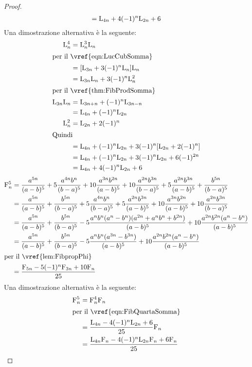 \begin{proof}
\begin{align*}
	={}&\mathrm{L}_{4n}+4(-1)^n\mathrm{L}_{2n}+6\\
\end{align*}
Una dimostrazione alternativa è la seguente:
\begin{align*}
\Luc{n}^4={}&\Luc{n}^3\Luc{n}\\
\intertext{per il~\vref{eqn:LucCubSomma}}
={}&[\Luc{3n}+3(-1)^n\Luc{n}]\Luc{n}\\
={}&\Luc{3n}\Luc{n}+3(-1)^n\Luc{n}^2\\
\intertext{per il~\vref{thm:FibProdSomma}}
\Luc{3n}\Luc{n}={}&\Luc{3n+n}+(-1)^n\Luc{3n-n}\\
={}&\Luc{4n}+(-1)^n\Luc{2n}\\
\Luc{n}^2={}&\Luc{2n}+2(-1)^n\\
\intertext{Quindi}
={}&\Luc{4n}+(-1)^n\Luc{2n}+3(-1)^n[\Luc{2n}+2(-1)^n]\\
={}&\Luc{4n}+(-1)^n\Luc{2n}+3(-1)^n\Luc{2n}+6(-1)^{2n}\\
={}&\Luc{4n}+4(-1)^n\Luc{2n}+6\\
\end{align*}
\begin{align*}
\Fib{n}^5={}&\dfrac{a^{5n}}{(a-b)^5}+5\dfrac{a^{4n}b^{n}}{(b-a)^5}+10\dfrac{a^{3n}b^{2n}}{(a-b)^5}+10\dfrac{a^{2n}b^{3n}}{(b-a)^5}+5\dfrac{a^{2n}b^{3n}}{(a-b)^5}+\dfrac{b^{5n}}{(b-a)^5}\\
={}&\dfrac{a^{5n}}{(a-b)^5}+\dfrac{b^{5n}}{(b-a)^5}+5\dfrac{a^{4n}b^{n}}{(b-a)^5}+5\dfrac{a^{2n}b^{3n}}{(a-b)^5}+10\dfrac{a^{3n}b^{2n}}{(a-b)^5}+10\dfrac{a^{2n}b^{3n}}{(b-a)^5}\\
={}&\dfrac{a^{5n}}{(a-b)^5}+\dfrac{b^{5n}}{(b-a)^5}-5\dfrac{a^nb^n(a^n-b^n)(a^{2n}+a^nb^n+b^{2n})}{(a-b)^5}+10\dfrac{a^{2n}b^{2n}(a^n-b^n)}{(a-b)^5}\\
={}&\dfrac{a^{5n}}{(a-b)^5}+\dfrac{b^{5n}}{(b-a)^5}-5\dfrac{a^nb^n(a^{3n}-b^{3n})}{(a-b)^5}+10\dfrac{a^{2n}b^{2n}(a^n-b^n)}{(a-b)^5}\\
	\intertext{per il~\vref{lem:FibpropPhi}} 
={}&\dfrac{\Fib{5n}-5(-1)^n\Fib{3n}+10\Fib{n}}{25}\\	
\end{align*}
Una dimostrazione alternativa è la seguente:
\begin{align*}
	\Fib{n}^5={}&\Fib{n}^4\Fib{n}\\
	\intertext{per il~\vref{eqn:FibQuartaSomma}}
	={}&\dfrac{\Luc{4n}-4(-1)^n\Luc{2n}+6}{25}\Fib{n}\\
	={}&\dfrac{\Luc{4n}\Fib{n}-4(-1)^n\Luc{2n}\Fib{n}+6\Fib{n}}{25}\\

\end{align*}
\end{proof}
